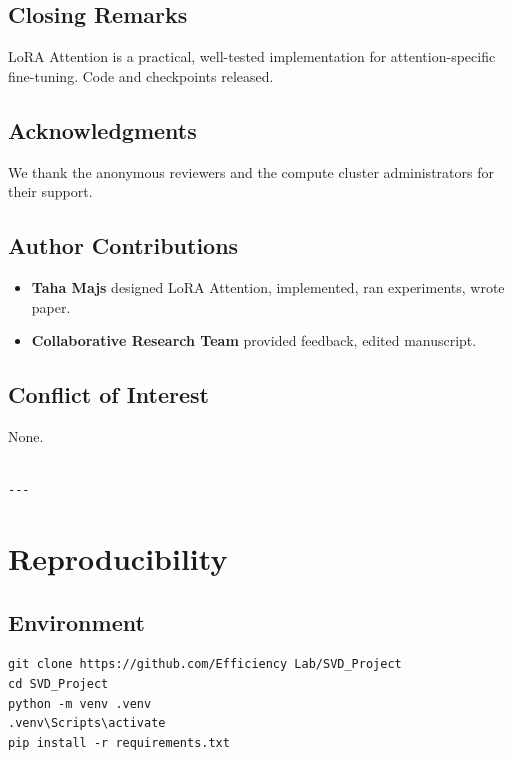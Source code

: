 \subsection{Closing Remarks}

LoRA Attention is a practical, well-tested implementation for 
attention-specific fine-tuning. Code and checkpoints released.

\subsection{Acknowledgments}

We thank the anonymous reviewers and the compute cluster administrators for their support.

\subsection{Author Contributions}

\begin{itemize}
\item \textbf{Taha Majs} designed LoRA Attention, implemented, ran experiments,
  wrote paper.
\item \textbf{Collaborative Research Team} provided feedback, edited manuscript.

\end{itemize}
\subsection{Conflict of Interest}

None.
\begin{lstlisting}

---
\end{lstlisting}

\section{Reproducibility}

\subsection{Environment}

\begin{lstlisting}
git clone https://github.com/Efficiency Lab/SVD_Project
cd SVD_Project
python -m venv .venv
.venv\Scripts\activate
pip install -r requirements.txt
\end{lstlisting}

